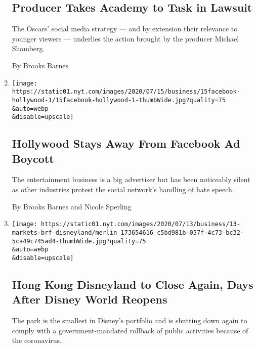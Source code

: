 \begin{enumerate}
  \hypertarget{producer-takes-academy-to-task-in-lawsuit}{%
  \subsection{Producer Takes Academy to Task in
  Lawsuit}\label{producer-takes-academy-to-task-in-lawsuit}}

  The Oscars' social media strategy --- and by extension their relevance
  to younger viewers --- underlies the action brought by the producer
  Michael Shamberg.

  By Brooks Barnes
\item
  \href{/2020/07/15/business/media/hollywood-facebook-ad-boycott.html}{}

  \texttt{[image: https://static01.nyt.com/images/2020/07/15/business/15facebook-hollywood-1/15facebook-hollywood-1-thumbWide.jpg?quality=75\\\&auto=webp\\\&disable=upscale]}

  \hypertarget{hollywood-stays-away-from-facebook-ad-boycott}{%
  \subsection{Hollywood Stays Away From Facebook Ad
  Boycott}\label{hollywood-stays-away-from-facebook-ad-boycott}}

  The entertainment business is a big advertiser but has been noticeably
  silent as other industries protest the social network's handling of
  hate speech.

  By Brooks Barnes and Nicole Sperling
\item
  \href{/2020/07/13/business/hong-kong-disneyland-closing.html}{}

  \texttt{[image: https://static01.nyt.com/images/2020/07/13/business/13-markets-brf-disneyland/merlin\_173654616\_c5bd981b-057f-4c73-bc32-5ca49c745ad4-thumbWide.jpg?quality=75\\\&auto=webp\\\&disable=upscale]}

  \hypertarget{hong-kong-disneyland-to-close-again-days-after-disney-world-reopens}{%
  \subsection{Hong Kong Disneyland to Close Again, Days After Disney
  World
  Reopens}\label{hong-kong-disneyland-to-close-again-days-after-disney-world-reopens}}

  The park is the smallest in Disney's portfolio and is shutting down
  again to comply with a government-mandated rollback of public
  activities because of the coronavirus.


\end{enumerate}
